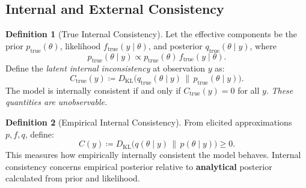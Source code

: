 \documentclass{article}
\theoremstyle{definition}
\newtheorem{definition}{Definition}
\begin{document}

\newpage

\subsection{Internal and External Consistency}

\begin{definition}[True Internal Consistency]
Let the effective components be the prior $p_{\mathrm{true}}(\theta)$, likelihood $f_{\mathrm{true}}(y \mid \theta)$, and posterior $q_{\mathrm{true}}(\theta \mid y)$, where
\[
p_{\mathrm{true}}(\theta \mid y) \propto p_{\mathrm{true}}(\theta) \, f_{\mathrm{true}}(y \mid \theta).
\]
Define the \emph{latent internal inconsistency} at observation $y$ as:
\[
C_{\mathrm{true}}(y) \coloneqq D_{\mathrm{KL}}\big(q_{\mathrm{true}}(\theta \mid y) \,\|\, p_{\mathrm{true}}(\theta \mid y)\big).
\]
The model is internally consistent if and only if $C_{\mathrm{true}}(y) = 0$ for all $y$. \emph{These quantities are unobservable.}
\end{definition}

\begin{definition}[Empirical Internal Consistency]
From elicited approximations $p, f, q$, define:
\[
C(y) \coloneqq D_{\mathrm{KL}}\big(q(\theta \mid y) \,\|\, p(\theta \mid y)\big) \geq 0.
\]
This measures how empirically internally consistent the model behaves. Internal consistency concerns empirical posterior relative to \textbf{analytical} posterior calculated from prior and likelihood.
\end{definition}
\end{document}
